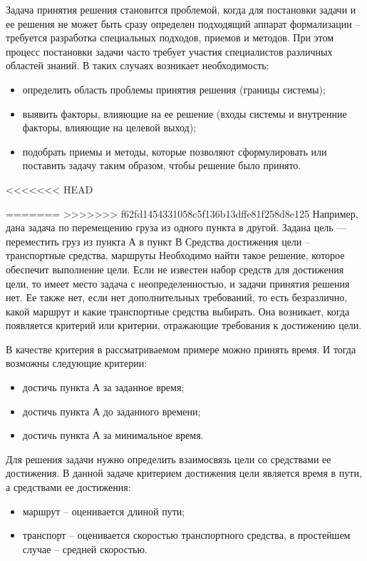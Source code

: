 \documentclass[a4paper,12pt,oneside,final]{extarticle}
\numberwithin{equation}{section}
\begin{document}
Задача принятия решения становится проблемой, когда для постановки задачи и ее решения не может быть сразу определен подходящий аппарат формализации – требуется разработка специальных подходов, приемов и методов. 
При этом процесс постановки задачи часто требует участия специалистов различных областей знаний. В таких случаях возникает необходимость:
\begin{itemize}
	\item определить область проблемы принятия решения (границы системы);
	\item выявить факторы, влияющие на ее решение (входы системы и внутренние факторы, влияющие на целевой выход);
	\item подобрать приемы и методы, которые позволяют сформулировать или поставить задачу таким образом, чтобы решение было принято.
\end{itemize}
<<<<<<< HEAD

=======
>>>>>>> f62fd1454331058c5f136b13dffe81f258d8e125
Например, дана задача по перемещению груза из одного пункта в другой.
Задана цель --- переместить груз из пункта А в пункт В
Средства достижения цели – транспортные средства, маршруты
Необходимо найти такое решение, которое обеспечит выполнение цели.
Если не известен набор средств для достижения цели, то имеет место задача с неопределенностью, и задачи принятия решения нет. 
Ее также нет, если нет дополнительных требований, то есть безразлично, какой маршрут и какие транспортные средства выбирать. 
Она возникает, когда появляется критерий или критерии, отражающие требования к достижению цели. 

В качестве критерия в рассматриваемом примере можно принять время. И тогда возможны следующие критерии:
\begin{itemize}
	\item достичь пункта А за заданное время;
	\item достичь пункта А до заданного времени;
	\item достичь пункта А за минимальное время.
\end{itemize}

Для решения задачи нужно определить взаимосвязь цели со средствами ее достижения. В данной задаче критерием достижения цели является время в пути, а средствами ее достижения:
\begin{itemize}
	\item маршрут – оценивается длиной пути;
	\item транспорт – оценивается скоростью транспортного средства, в простейшем случае – средней скоростью.
\end{itemize}
\end{document}
